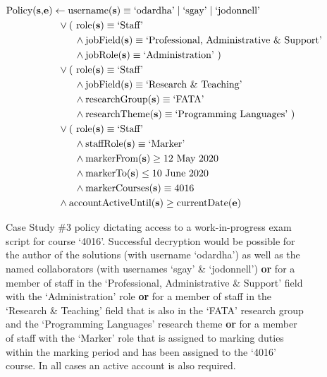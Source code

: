 \begin{figure}[ht]
  \centering
\begin{align*}
  \text{Policy(\textbf{s},\textbf{e})}
  &
    \leftarrow
    \text{username(\textbf{s})} \equiv \text{`odardha'} \mid \text{`sgay'} \mid \text{`jodonnell'}
  \\
  &
    \phantom{::}\vee
    \text{( role(\textbf{s})} \equiv \text{`Staff'}
  \\
  &
    \phantom{::::::::}\wedge
    \text{jobField(\textbf{s})} \equiv \text{`Professional, Administrative \& Support'}
  \\
  &
    \phantom{::::::::}\wedge
    \text{jobRole(\textbf{s})} \equiv \text{`Administration' )}
  \\
  &
    \phantom{::}\vee
    \text{( role(\textbf{s})} \equiv \text{`Staff'}
  \\
  &
    \phantom{::::::::}\wedge
    \text{jobField(\textbf{s})} \equiv \text{`Research \& Teaching'}
  \\
  &
    \phantom{::::::::}\wedge
    \text{researchGroup(\textbf{s})} \equiv \text{`FATA'}
  \\
  &
    \phantom{::::::::}\wedge
    \text{researchTheme(\textbf{s})} \equiv \text{`Programming Languages' )}
  \\
  &
    \phantom{::}\vee
    \text{( role(\textbf{s})} \equiv \text{`Staff'}
  \\
  &
    \phantom{::::::::}\wedge
    \text{staffRole(\textbf{s})} \equiv \text{`Marker'}
  \\
  &
    \phantom{::::::::}\wedge
    \text{markerFrom(\textbf{s})} \geq \text{12 May 2020}
  \\
  &
    \phantom{::::::::}\wedge
    \text{markerTo(\textbf{s})} \leq \text{10 June 2020}
  \\
  &
    \phantom{::::::::}\wedge
    \text{markerCourses(\textbf{s})} \equiv \text{4016}
  \\
  &
    \phantom{::}\wedge
    \text{accountActiveUntil(\textbf{s})} \geq \text{currentDate(\textbf{e})}
\end{align*}
  \caption{
    \label{fig:case_study_policy_3}
    Case Study \#3 policy dictating access to a work-in-progress exam script for course `4016'.
    Successful decryption would be possible for the author of the solutions (with username `odardha') as well as the named collaborators (with usernames `sgay' \& `jodonnell') \textbf{or} for a member of staff in the `Professional, Administrative \& Support' field with the `Administration' role \textbf{or} for a member of staff in the `Research \& Teaching' field that is also in the `FATA' research group and the `Programming Languages' research theme \textbf{or} for a member of staff with the `Marker' role that is assigned to marking duties within the marking period and has been assigned to the `4016' course. In all cases an active account is also required.
  }
\end{figure}
